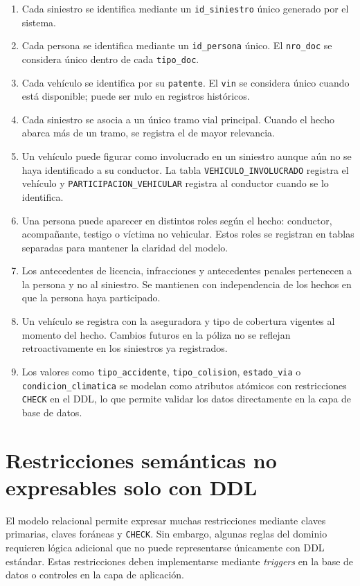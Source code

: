 \documentclass[12pt,a4paper]{article}
\begin{document}
\begin{enumerate}[leftmargin=*]
    \item Cada siniestro se identifica mediante un \texttt{id\_siniestro} único generado por el sistema.
    \item Cada persona se identifica mediante un \texttt{id\_persona} único. El \texttt{nro\_doc} se considera único dentro de cada \texttt{tipo\_doc}.
    \item Cada vehículo se identifica por su \texttt{patente}. El \texttt{vin} se considera único cuando está disponible; puede ser nulo en registros históricos.
    \item Cada siniestro se asocia a un único tramo vial principal. Cuando el hecho abarca más de un tramo, se registra el de mayor relevancia.
    \item Un vehículo puede figurar como involucrado en un siniestro aunque aún no se haya identificado a su conductor. La tabla \texttt{VEHICULO\_INVOLUCRADO} registra el vehículo y \texttt{PARTICIPACION\_VEHICULAR} registra al conductor cuando se lo identifica.
    \item Una persona puede aparecer en distintos roles según el hecho: conductor, acompañante, testigo o víctima no vehicular. Estos roles se registran en tablas separadas para mantener la claridad del modelo.
    \item Los antecedentes de licencia, infracciones y antecedentes penales pertenecen a la persona y no al siniestro. Se mantienen con independencia de los hechos en que la persona haya participado.
    \item Un vehículo se registra con la aseguradora y tipo de cobertura vigentes al momento del hecho. Cambios futuros en la póliza no se reflejan retroactivamente en los siniestros ya registrados.
    \item Los valores como \texttt{tipo\_accidente}, \texttt{tipo\_colision}, \texttt{estado\_via} o \texttt{condicion\_climatica} se modelan como atributos atómicos con restricciones \texttt{CHECK} en el DDL, lo que permite validar los datos directamente en la capa de base de datos.
\end{enumerate}

\section{Restricciones semánticas no expresables solo con DDL}

El modelo relacional permite expresar muchas restricciones mediante claves primarias, claves foráneas y \texttt{CHECK}. Sin embargo, algunas reglas del dominio requieren lógica adicional que no puede representarse únicamente con DDL estándar. Estas restricciones deben implementarse mediante \textit{triggers} en la base de datos o controles en la capa de aplicación.
\end{document}
